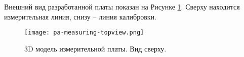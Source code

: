 Внешний вид разработанной платы показан на Рисунке \ref{fig:pa-measuring-topview}. Сверху находится измерительная линия, снизу – линия калибровки.

\begin{figure}[H]
	\centering
	\texttt{[image: pa-measuring-topview.png]}
	\caption{3D модель измерительной платы. Вид сверху.}%
	\label{fig:pa-measuring-topview}
\end{figure}



